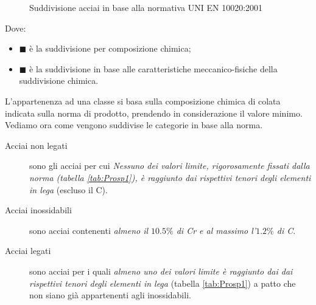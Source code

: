 \begin{figure}
\usetikzlibrary{trees}
\caption{Suddivisione acciai in base alla normativa UNI EN 10020:2001}
\label{fig:UNIEN10020:2001}
\end{figure}
Dove:
\begin{itemize}
\item \textcolor{UnifeLight}{$\blacksquare$} è la suddivisione per composizione chimica;
\item \textcolor{UnifeDark!80}{$\blacksquare$} è la suddivisione in base alle caratteristiche meccanico-fisiche della suddivisione chimica.
\end{itemize}
L'appartenenza ad una classe si basa sulla composizione chimica di colata indicata sulla norma di prodotto, prendendo in considerazione il valore minimo.
Vediamo ora come vengono suddivise le categorie in base alla norma.
\begin{description}
\item[Acciai non legati] sono gli acciai per cui \emph{Nessuno dei valori limite, rigorosamente fissati dalla norma (tabella \ref{tab:Prosp1}), è raggiunto dai rispettivi tenori degli elementi in lega} (escluso il C).
\item[Acciai inossidabili] sono acciai contenenti \emph{almeno il $10.5\%$ di Cr e al massimo l'$1.2\%$ di C}.
\item[Acciai legati] sono acciai per i quali \emph{almeno uno dei valori limite è raggiunto dai dai rispettivi tenori degli elementi in lega} (tabella \ref{tab:Prosp1}) a patto che non siano già appartenenti agli inossidabili.
\end{description}

